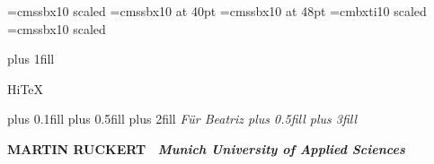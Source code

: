 %
%
%
%





\makeindex
\maketoc

\titletrue

\null

\font\largetitlefont=cmssbx10 scaled
\font\Largetitlefont=cmssbx10 at 40pt
\font\hugetitlefont=cmssbx10 at 48pt
\font\smalltitlefontit=cmbxti10 scaled
\font\smalltitlefont=cmssbx10 scaled

\hbox{}
\vskip 0pt plus 1fill
{
  \baselineskip=1cm\parindent=0pt
  \largetitlefont\raggedright  Hi\TeX\par
  \vskip 10pt plus 0.1fill
  \vskip-3pt
  \vskip 10pt plus 0.5fill
  \hskip 0pt plus 2fill \it  F\"ur Beatriz\hskip 0pt plus 0.5fill\hbox{}
  \vskip 10pt plus 3fill
  \bigskip
  \raggedright\baselineskip=12pt
  \bf MARTIN RUCKERT \ \it Munich University of Applied Sciences\par
  \bigskip
}
\eject

\titletrue
\begingroup
\figrm
\parindent=0pt

